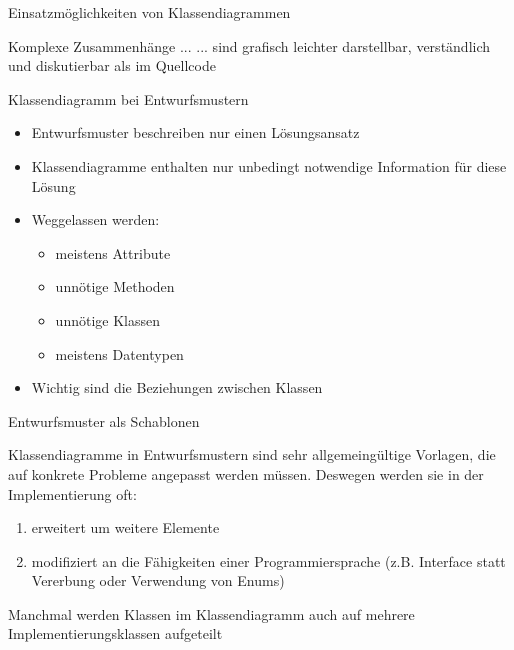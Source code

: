 \begin{frame}{Einsatzmöglichkeiten von Klassendiagrammen}
	\begin{exampleblock}{Komplexe Zusammenhänge ...}
	    ... sind grafisch leichter darstellbar, verständlich und diskutierbar als im Quellcode
	\end{exampleblock}
\end{frame}

\begin{frame}{Klassendiagramm bei Entwurfsmustern}
        \begin{itemize}
            \item Entwurfsmuster beschreiben nur einen Lösungsansatz
            \item Klassendiagramme enthalten nur unbedingt notwendige Information für diese Lösung
            \item Weggelassen werden:
                \begin{itemize}
                    \item meistens Attribute
                    \item unnötige Methoden
                    \item unnötige Klassen
                    \item meistens Datentypen
                \end{itemize}
            \item Wichtig sind die Beziehungen zwischen Klassen
        \end{itemize}
\end{frame}

\begin{frame}{Entwurfsmuster als Schablonen}
	\begin{block}{Klassendiagramme in Entwurfsmustern}
        sind sehr allgemeingültige Vorlagen, die auf konkrete Probleme angepasst werden müssen. Deswegen werden sie in der Implementierung oft:
        \begin{enumerate}
            \item erweitert um weitere Elemente
            \item modifiziert an die Fähigkeiten einer Programmiersprache (z.B. Interface statt Vererbung oder Verwendung von Enums)
        \end{enumerate}
        Manchmal werden Klassen im Klassendiagramm auch auf mehrere Implementierungsklassen aufgeteilt
	\end{block}
\end{frame}